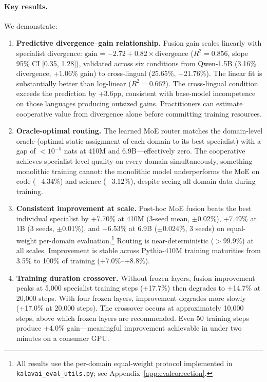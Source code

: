 \documentclass{article}
\begin{document}
\paragraph{Key results.} We demonstrate:
\begin{enumerate}[leftmargin=*, itemsep=2pt]
  \item \textbf{Predictive divergence--gain relationship.} Fusion gain scales linearly with specialist divergence: $\text{gain} = -2.72 + 0.82 \times \text{divergence}$ ($R^2 = 0.856$, slope 95\% CI [0.35, 1.28]), validated across six conditions from Qwen-1.5B (3.16\% divergence, +1.06\% gain) to cross-lingual (25.65\%, +21.76\%). The linear fit is substantially better than log-linear ($R^2 = 0.662$). The cross-lingual condition exceeds the prediction by +3.6pp, consistent with base-model incompetence on those languages producing outsized gains. Practitioners can estimate cooperative value from divergence alone before committing training resources.
  \item \textbf{Oracle-optimal routing.} The learned MoE router matches the domain-level oracle (optimal static assignment of each domain to its best specialist) with a gap of $<10^{-5}$ nats at 410M and 6.9B---effectively zero. The cooperative achieves specialist-level quality on every domain simultaneously, something monolithic training cannot: the monolithic model underperforms the MoE on code ($-4.34\%$) and science ($-3.12\%$), despite seeing all domain data during training.
  \item \textbf{Consistent improvement at scale.} Post-hoc MoE fusion beats the best individual specialist by +7.70\% at 410M (3-seed mean, $\pm$0.02\%), +7.49\% at 1B (3 seeds, $\pm$0.01\%), and +6.53\% at 6.9B ($\pm$0.024\%, 3 seeds) on equal-weight per-domain evaluation.\footnote{All results use the per-domain equal-weight protocol implemented in \texttt{kalavai\_eval\_utils.py}; see Appendix~\ref{app:evalcorrection}.} Routing is near-deterministic ($>$99.9\%) at all scales. Improvement is stable across Pythia-410M training maturities from 3.5\% to 100\% of training (+7.0\%--+8.8\%).
  \item \textbf{Training duration crossover.} Without frozen layers, fusion improvement peaks at 5,000 specialist training steps (+17.7\%) then degrades to +14.7\% at 20,000 steps. With four frozen layers, improvement degrades more slowly (+17.0\% at 20,000 steps). The crossover occurs at approximately 10,000 steps, above which frozen layers are recommended. Even 50 training steps produce +4.0\% gain---meaningful improvement achievable in under two minutes on a consumer GPU.

\end{enumerate}
\end{document}
